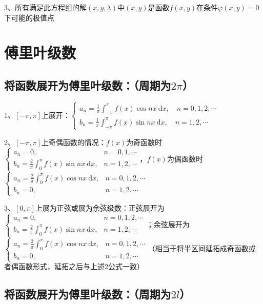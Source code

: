 3、所有满足此方程组的解$(x, y, \lambda)$中$(x, y)$是函数$f(x, y)$在条件$\varphi(x, y)=0$下可能的极值点

\section{傅里叶级数}



\subsection{将函数展开为傅里叶级数：（周期为$2\pi$）}

1、$[-\pi, \pi]$上展开：$\left\{\begin{array}{l} a_{n}=\frac{1}{\pi} \int_{-\pi}^{\pi} f(x) \cos n x \mathrm{~d} x, \quad n=0,1,2, \cdots \\ b_{n}=\frac{1}{\pi} \int_{-\pi}^{\pi} f(x) \sin n x \mathrm{~d} x, \quad n=1,2, \cdots \end{array}\right.$

2、$[-\pi, \pi]$上奇偶函数的情况：$f(x)$为奇函数时$\begin{cases}a_{n}=0, & n=0,1, \cdots \\ b_{n}=\frac{2}{\pi} \int_{0}^{\pi} f(x) \sin n x \mathrm{~d} x, & n=1,2, \cdots\end{cases}$，$f(x)$为偶函数时$\begin{cases}a_{n}=\frac{2}{\pi} \int_{0}^{\pi} f(x) \cos n x \mathrm{~d} x, & n=0,1,2, \cdots \\ b_{n}=0, & n=1,2, \cdots\end{cases}$

3、$[0, \pi]$上展为正弦或展为余弦级数：正弦展开为$\begin{cases}a_{n}=0, & n=0,1,2, \cdots \\ b_{n}=\frac{2}{\pi} \int_{0}^{\pi} f(x) \sin n x \mathrm{~d} x, & n=1,2, \cdots\end{cases}$；余弦展开为$\begin{cases}a_{n}=\frac{2}{\pi} \int_{0}^{\pi} f(x) \cos n x \mathrm{~d} x, & n=0,1,2, \cdots \\ b_{n}=0, & n=1,2, \cdots\end{cases}$（相当于将半区间延拓成奇函数或者偶函数形式，延拓之后与上述2公式一致）



\subsection{将函数展开为傅里叶级数：（周期为$2l$）}

